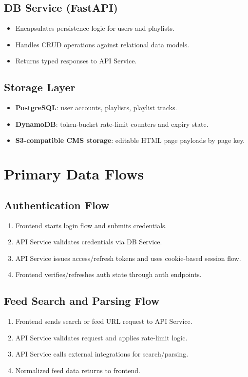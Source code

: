 \documentclass{article}
\begin{document}
\subsection{DB Service (FastAPI)}
\begin{itemize}
\item Encapsulates persistence logic for users and playlists.
\item Handles CRUD operations against relational data models.
\item Returns typed responses to API Service.
\end{itemize}

\subsection{Storage Layer}
\begin{itemize}
\item \textbf{PostgreSQL}: user accounts, playlists, playlist tracks.
\item \textbf{DynamoDB}: token-bucket rate-limit counters and expiry state.
\item \textbf{S3-compatible CMS storage}: editable HTML page payloads by page key.
\end{itemize}

\section{Primary Data Flows}
\subsection{Authentication Flow}
\begin{enumerate}
\item Frontend starts login flow and submits credentials.
\item API Service validates credentials via DB Service.
\item API Service issues access/refresh tokens and uses cookie-based session flow.
\item Frontend verifies/refreshes auth state through auth endpoints.
\end{enumerate}

\subsection{Feed Search and Parsing Flow}
\begin{enumerate}
\item Frontend sends search or feed URL request to API Service.
\item API Service validates request and applies rate-limit logic.
\item API Service calls external integrations for search/parsing.
\item Normalized feed data returns to frontend.
\end{enumerate}
\end{document}
